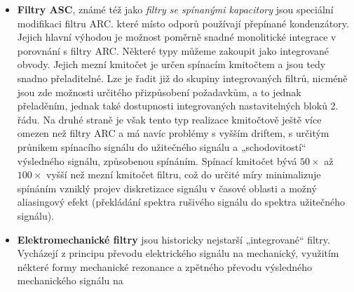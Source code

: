 {\begin{itemize}
                operační zesilovače. Mají obdobné vlastnosti jako filtry RLC. ale vzhledem k
                vlastnostem aktivních prvků se jejich použití omezuje nejčastéji na kmitočtové pásmo
                přibližné \SI{0.1}{\hertz} až \SI{100}{\kilo\hertz}. Současný pokrok v technologii
                aktivních prvků však umožňuje využití těchto filtrů na stále vyšších kmitočtech
                (dnes již řádové jednotky až desítky \si{\mega\hertz}), i když toto použití je zatím
                málo rozšířené. Kmitočtově jsou tedy vhodným doplňkem k filtrům RLC. Oproti nim mají
                výhodu i v snazší nastavitelnosti a laditelnosti změnou hodnot odporů. Jejich
                nevýhodou je na druhé straně potřeba napájení aktivních prvků. Objevují se i jejich
                specifické modifikace využívající parazitních vlastností aktivních prvků (R nebo C)
                jako stavebních prvků - filtry AC. AR apod.
          \item \textbf{Filtry ASC}, známé též jako \emph{filtry se spínanými kapacitory} jsou
                speciální modifikaci filtru ARC. které místo odporů používají přepínané
                kondenzátory. Jejich hlavní výhodou je možnost poměrně snadné monolitické integrace
                v porovnání s filtry ARC. Některé typy můžeme zakoupit jako integrované obvody.
                Jejich mezní kmitočet je určen spínacím kmitočtem a jsou tedy snadno přeladitelné.
                Lze je řadit již do skupiny integrovaných filtrů, nicméně jsou zde možnosti
                určitého přizpůsobení požadavkům, a to jednak přeladěním, jednak také dostupnosti
                integrovaných nastavitelných bloků 2. řádu. Na druhé straně je však tento typ
                realizace kmitočtově ještě více omezen než filtry ARC a má navíc problémy s vyšším
                driftem, s určitým průnikem spínacího signálu do užitečného signálu a
                „schodovitostí“ výsledného signálu, způsobenou spínáním. Spínací kmitočet bývá
                \(\num{50}\times\) až \(\num{100}\times\) vyšší než mezní kmitočet filtru, což do
                určité míry minimalizuje spínáním vzniklý projev diskretizace signálu v časové
                oblasti a možný aliasingový efekt (překládání spektra rušivého signálu do spektra
                užitečného signálu).
          \item \textbf{Elektromechanické filtry} jsou historicky nejstarší „integrované“ filtry.
                Vycházejí z principu převodu elektrického signálu na mechanický, využitím nékteré
                formy mechanické rezonance a zpětného převodu výsledného mechanického signálu na

\end{itemize}}
